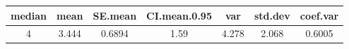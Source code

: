 \documentclass[]{article}
\begin{document}
\begin{longtable}[]{@{}ccccccc@{}}
\toprule
\begin{minipage}[b]{0.10\columnwidth}\centering\strut
median\strut
\end{minipage} & \begin{minipage}[b]{0.09\columnwidth}\centering\strut
mean\strut
\end{minipage} & \begin{minipage}[b]{0.11\columnwidth}\centering\strut
SE.mean\strut
\end{minipage} & \begin{minipage}[b]{0.17\columnwidth}\centering\strut
CI.mean.0.95\strut
\end{minipage} & \begin{minipage}[b]{0.09\columnwidth}\centering\strut
var\strut
\end{minipage} & \begin{minipage}[b]{0.11\columnwidth}\centering\strut
std.dev\strut
\end{minipage} & \begin{minipage}[b]{0.11\columnwidth}\centering\strut
coef.var\strut
\end{minipage}\tabularnewline
\midrule
\endhead
\begin{minipage}[t]{0.10\columnwidth}\centering\strut
4\strut
\end{minipage} & \begin{minipage}[t]{0.09\columnwidth}\centering\strut
3.444\strut
\end{minipage} & \begin{minipage}[t]{0.11\columnwidth}\centering\strut
0.6894\strut
\end{minipage} & \begin{minipage}[t]{0.17\columnwidth}\centering\strut
1.59\strut
\end{minipage} & \begin{minipage}[t]{0.09\columnwidth}\centering\strut
4.278\strut
\end{minipage} & \begin{minipage}[t]{0.11\columnwidth}\centering\strut
2.068\strut
\end{minipage} & \begin{minipage}[t]{0.11\columnwidth}\centering\strut
0.6005\strut
\end{minipage}\tabularnewline
\bottomrule
\end{longtable}
\end{document}
